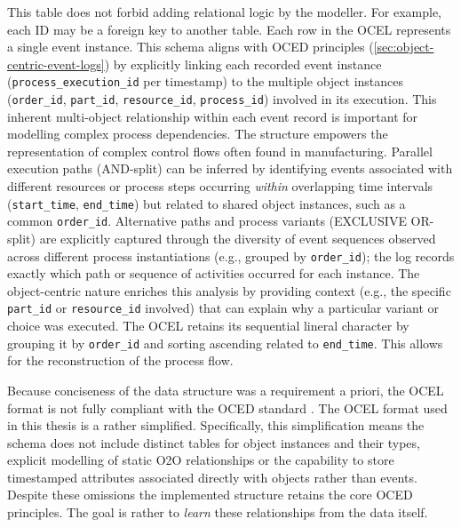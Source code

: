 This table does not forbid adding relational logic by the modeller. For example, each ID may be a foreign key to another table. Each row in the OCEL represents a single event instance. This schema aligns with OCED principles (\autoref{sec:object-centric-event-logs}) by explicitly linking each recorded event instance (\texttt{process\_execution\_id} per timestamp) to the multiple object instances (\texttt{order\_id}, \texttt{part\_id}, \texttt{resource\_id}, \texttt{process\_id}) involved in its execution. This inherent multi-object relationship within each event record is important for modelling complex process dependencies. The structure empowers the representation of complex control flows often found in manufacturing. Parallel execution paths (AND-split) can be inferred by identifying events associated with different resources or process steps occurring \textit{within} overlapping time intervals (\texttt{start\_time}, \texttt{end\_time}) but related to shared object instances, such as a common \texttt{order\_id}. Alternative paths and process variants (EXCLUSIVE OR-split) are explicitly captured through the diversity of event sequences observed across different process instantiations (e.g., grouped by \texttt{order\_id}); the log records exactly which path or sequence of activities occurred for each instance. The object-centric nature enriches this analysis by providing context (e.g., the specific \texttt{part\_id} or \texttt{resource\_id} involved) that can explain why a particular variant or choice was executed. The OCEL retains its sequential lineral character by grouping it by \texttt{order\_id} and sorting ascending related to \texttt{end\_time}. This allows for the reconstruction of the process flow.

Because conciseness of the data structure was a requirement a priori, the OCEL format is not fully compliant with the OCED standard \autocite{van2023object}. The OCEL format used in this thesis is a rather simplified. Specifically, this simplification means the schema does not include distinct tables for object instances and their types, explicit modelling of static O2O relationships or the capability to store timestamped attributes associated directly with objects rather than events. Despite these omissions the implemented structure retains the core OCED principles. The goal is rather to \textit{learn} these relationships from the data itself.

